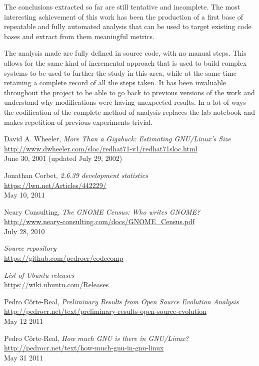 \documentclass[11pt]{article}
\begin{document}
The conclusions extracted so far are still tentative and incomplete. The most interesting achievement of this work has been the production of a first base of repeatable and fully automated analysis that can be used to target existing code bases and extract from them meaningful metrics. 

The analysis made are fully defined in source code, with no manual steps. This allows for the same kind of incremental approach that is used to build complex systems to be used to further the study in this area, while at the same time retaining a complete record of all the steps taken. It has been invaluable throughout the project to be able to go back to previous versions of the work and understand why modifications were having unexpected results. In a lot of ways the codification of the complete method of analysis replaces the lab notebook and makes repetition of previous experiments trivial.

\newpage
\begin{thebibliography}{9}

David A. Wheeler,
\emph{More Than a Gigabuck: Estimating GNU/Linux's Size}\\
\url{http://www.dwheeler.com/sloc/redhat71-v1/redhat71sloc.html}\\
June 30, 2001 (updated July 29, 2002)

Jonathan Corbet,
\emph{2.6.39 development statistics}\\
\url{https://lwn.net/Articles/442229/}\\
May 10, 2011

Neary Consulting,
\emph{The GNOME Census: Who writes GNOME?}\\
\url{http://www.neary-consulting.com/docs/GNOME_Census.pdf}\\
July 28, 2010

\emph{Source repository}\\
\url{https://github.com/pedrocr/codecomp}

\emph{List of Ubuntu releases}\\
\url{https://wiki.ubuntu.com/Releases}

Pedro Côrte-Real,
\emph{Preliminary Results from Open Source Evolution Analysis}\\
\url{http://pedrocr.net/text/preliminary-results-open-source-evolution}\\
May 12 2011

Pedro Côrte-Real,
\emph{How much GNU is there in GNU/Linux?}\\
\url{http://pedrocr.net/text/how-much-gnu-in-gnu-linux}\\
May 31 2011

\end{thebibliography}
\end{document}
